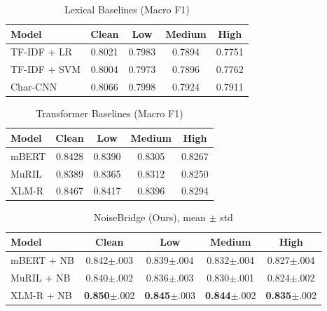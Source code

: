 \documentclass[conference]{IEEEtran}
\begin{document}
\vspace{-0.4em}

\begin{table}[H]
\caption{Lexical Baselines (Macro F1)}
\label{tab:lexical}
\centering
\small
\setlength{\tabcolsep}{3pt}
\begin{tabular}{lcccc}
\toprule
Model & Clean & Low & Medium & High \\
\midrule
TF-IDF + LR  & 0.8021 & 0.7983 & 0.7894 & 0.7751 \\
TF-IDF + SVM & 0.8004 & 0.7973 & 0.7896 & 0.7762 \\
Char-CNN     & 0.8066 & 0.7998 & 0.7924 & 0.7911 \\
\bottomrule
\end{tabular}
\end{table}

\vspace{-0.8em}

\begin{table}[H]
\caption{Transformer Baselines (Macro F1)}
\label{tab:transformer}
\centering
\small
\setlength{\tabcolsep}{3pt}
\begin{tabular}{lcccc}
\toprule
Model & Clean & Low & Medium & High \\
\midrule
mBERT & 0.8428 & 0.8390 & 0.8305 & 0.8267 \\
MuRIL & 0.8389 & 0.8365 & 0.8312 & 0.8250 \\
XLM-R & 0.8467 & 0.8417 & 0.8396 & 0.8294 \\
\bottomrule
\end{tabular}
\end{table}

\vspace{-0.8em}

\begin{table}[H]
\caption{NoiseBridge (Ours), mean $\pm$ std}
\label{tab:noisebridge}
\centering
\small
\setlength{\tabcolsep}{3pt}
\renewcommand{\arraystretch}{1.15}
\begin{tabular}{lcccc}
\toprule
Model & Clean & Low & Medium & High \\
\midrule
mBERT + NB & 0.842$\pm$.003 & 0.839$\pm$.004 & 0.832$\pm$.004 & 0.827$\pm$.004 \\
MuRIL + NB & 0.840$\pm$.002 & 0.836$\pm$.003 & 0.830$\pm$.001 & 0.824$\pm$.002 \\
XLM-R + NB & \textbf{0.850}$\pm$.002 & \textbf{0.845}$\pm$.003 & \textbf{0.844}$\pm$.002 & \textbf{0.835}$\pm$.002 \\
\bottomrule
\end{tabular}
\end{table}
\end{document}
